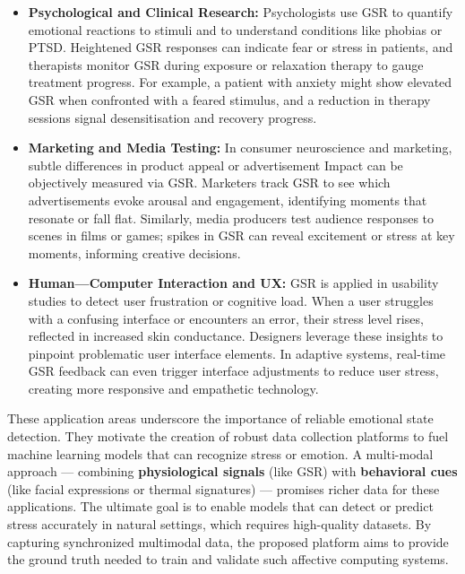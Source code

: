 \documentclass[11pt,a4paper]{report}
\begin{document}
\begin{itemize}
\item \textbf{Psychological and Clinical Research:} Psychologists use GSR to
  quantify emotional reactions to stimuli and to understand conditions
  like phobias or PTSD. Heightened GSR responses can indicate fear or
  stress in patients, and therapists monitor GSR during exposure or
  relaxation therapy to gauge treatment
  progress\cite{AppleHealthWatch2019}\cite{SamsungHealth2020}.
  For example, a patient with anxiety might show elevated GSR when
  confronted with a feared stimulus, and a reduction in therapy
  sessions signal desensitisation and recovery progress.
\item \textbf{Marketing and Media Testing:} In consumer neuroscience and
  marketing, subtle differences in product appeal or advertisement
  Impact can be objectively measured via GSR. Marketers track GSR to see
  which advertisements evoke arousal and engagement, identifying moments
  that resonate or fall
  flat\cite{Fowles1981}\cite{Healey2005}.
  Similarly, media producers test audience responses to scenes in films
  or games; spikes in GSR can reveal excitement or stress at key
  moments, informing creative decisions.
\item \textbf{Human---Computer Interaction and UX:} GSR is applied in usability
  studies to detect user frustration or cognitive load. When a user
  struggles with a confusing interface or encounters an error, their
  stress level rises, reflected in increased skin
  conductance\cite{Picard2001}.
  Designers leverage these insights to pinpoint problematic user
  interface elements. In adaptive systems, real-time GSR feedback can
  even trigger interface adjustments to reduce user stress, creating
  more responsive and empathetic technology.

\end{itemize}
These application areas underscore the importance of reliable emotional
state detection. They motivate the creation of robust data collection
platforms to fuel machine learning models that can recognize stress or
emotion. A multi-modal approach --- combining \textbf{physiological signals}
(like GSR) with \textbf{behavioral cues} (like facial expressions or thermal
signatures) --- promises richer data for these applications. The ultimate
goal is to enable models that can detect or predict stress accurately in
natural settings, which requires high-quality datasets.
By capturing synchronized multimodal data, the proposed platform aims to
provide the ground truth needed to train and validate such
affective computing systems.
\end{document}
